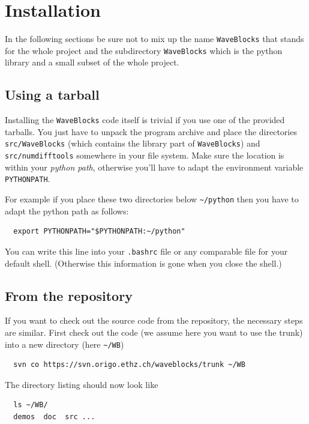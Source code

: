 \documentclass[a4paper,10pt]{report}
\begin{document}
\section{Installation}

In the following sections be sure not to mix up the name \texttt{WaveBlocks}
that stands for the whole project and the subdirectory \texttt{WaveBlocks}
which is the python library and a small subset of the whole project.

\subsection*{Using a tarball}

Installing the \texttt{WaveBlocks} code itself is trivial if you use one of the
provided tarballs. You just have to unpack the program archive and place the
directories \texttt{src/WaveBlocks} (which contains the library part of \texttt{WaveBlocks})
and \texttt{src/numdifftools} somewhere in your file system. Make sure the
location is within your \textit{python path}, otherwise you'll have to adapt the
environment variable \texttt{PYTHONPATH}.

For example if you place these two directories below \verb|~/python| then you have
to adapt the python path as follows:

\begin{verbatim}
  export PYTHONPATH="$PYTHONPATH:~/python"
\end{verbatim}

You can write this line into your \texttt{.bashrc} file or any comparable file
for your default shell. (Otherwise this information is gone when you close the
shell.)

\subsection*{From the repository}

If you want to check out the source code from the repository, the necessary
steps are similar. First check out the code (we assume here you want to use
the trunk) into a new directory (here \verb|~/WB|)

\begin{verbatim}
  svn co https://svn.origo.ethz.ch/waveblocks/trunk ~/WB
\end{verbatim}

The directory listing should now look like

\begin{verbatim}
  ls ~/WB/
  demos  doc  src ...
\end{verbatim}
\end{document}
